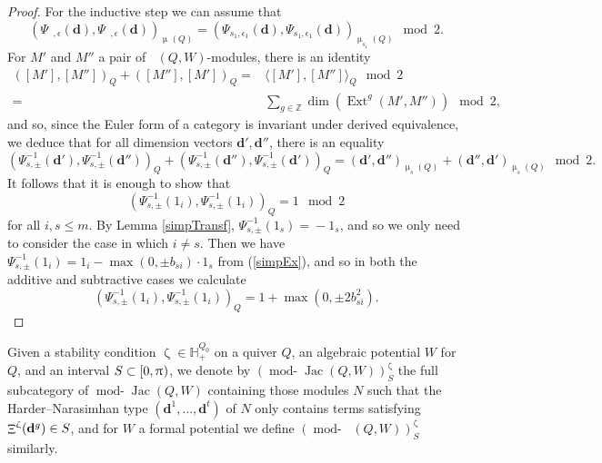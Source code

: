 \documentclass[a4paper,10pt]{amsart}
\newcommand{\dd}{\mathbf{d}}
\renewcommand{\zeta}{\upzeta}
\renewcommand{\pi}{\uppi\hspace{0.05em}}
\renewcommand{\mu}{\upmu}
\DeclareMathOperator{\Mu}{\Upxi}
\DeclareMathOperator{\Ext}{Ext}
\DeclareMathOperator{\tmod}{mod-}
\newcommand{\rmod}[1]{\tmod\!#1}
\DeclareMathOperator{\Jac}{Jac}
\DeclareMathOperator{\HJac}{\widehat{Jac}}
\DeclareMathOperator{\Ss}{\overline{s}}
\begin{document}
\begin{proof}
For the inductive step we can assume that
\[
(\Psi_{\Ss,\epsilon}(\dd),\Psi_{\Ss,\epsilon}(\dd))_{\mu_{\Ss}(Q)}=(\Psi_{s_1,\epsilon_1}(\dd),\Psi_{s_1,\epsilon_1}(\dd))_{\mu_{s_1}(Q)}\mod 2.
\]
For $M'$ and $M''$ a pair of $\HJac(Q,W)$-modules, there is an identity 
\begin{align*}
([M'],[M''])_Q+([M''],[M'])_Q=&\langle [M'],[M'']\rangle_Q\mod 2\\
=&\sum_{g\in\mathbb{Z}}\dim\left(\Ext^g(M',M'')\right)\mod 2,
\end{align*}
and so, since the Euler form of a category is invariant under derived equivalence, we deduce that for all dimension vectors $\dd',\dd''$, there is an equality
\[
(\Psi_{s,\pm}^{-1}(\dd'),\Psi_{s,\pm}^{-1}(\dd''))_Q+(\Psi_{s,\pm}^{-1}(\dd''),\Psi_{s,\pm}^{-1}(\dd'))_Q=(\dd',\dd'')_{\mu_s(Q)}+(\dd'',\dd')_{\mu_s(Q)}\mod 2.
\]
It follows that it is enough to show that
\[
(\Psi^{-1}_{s,\pm }(1_i),\Psi^{-1}_{s,\pm }(1_i))_{Q}=1\mod 2
\]
for all $i,s\leq m$.  By Lemma \ref{simpTransf}, $\Psi_{s,\pm}^{-1}(1_s)={}-1_s$, and so we only need to consider the case in which $i\neq s$.  Then we have $\Psi^{-1}_{s,\pm}(1_i)=1_i-\max(0,\pm b_{si})\cdot 1_s$ from (\ref{simpEx}), and so in both the additive and subtractive cases we calculate
\[
(\Psi^{-1}_{s,\pm }(1_i),\Psi^{-1}_{s,\pm }(1_i))_{Q}=1+\max(0,\pm 2b_{si}^2).
\]
\end{proof}

Given a stability condition $\zeta\in\mathbb{H}_+^{Q_0}$ on a quiver $Q$, an algebraic potential $W$ for $Q$, and an interval $S\subset [0,\pi)$, we denote by $(\rmod{\Jac(Q,W)})^{\zeta}_{S}$ the full subcategory of $\rmod{\Jac(Q,W)}$ containing those modules $N$ such that the Harder--Narasimhan type $(\dd^1,\ldots,\dd^t)$ of $N$ only contains terms satisfying $\Mu^{\zeta}(\dd^g)\in S$, and for $W$ a formal potential we define $(\rmod{\HJac(Q,W)})^{\zeta}_S$ similarly.
\end{document}
